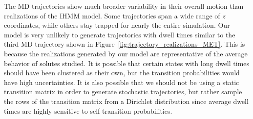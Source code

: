 \documentclass[journal=jpcbfk,manuscript=article]{achemso}
\begin{document}
  The MD trajectories show much broader variability in their overall motion than realizations
  of the IHMM model. 
  Some trajectories span a wide range of $z$ coordinates, while others stay
  trapped for nearly the entire simulation. Our model is very unlikely to generate 
  trajectories with dwell times similar to the third MD trajectory shown in 
  Figure~\ref{fig:trajectory_realizations_MET}. This is because the realizations 
  generated by our model are representative of the average behavior of solutes studied.
  It is possible that certain states with long dwell times should have been
  clustered as their own, but the transition probabilities would have high uncertainties.
  It is also possible that we should not be using a static transition matrix in 
  order to generate stochastic trajectories, but rather sample the rows of the transition
  matrix from a Dirichlet distribution since average dwell times are highly sensitive to
  self transition probabilities.
\end{document}
